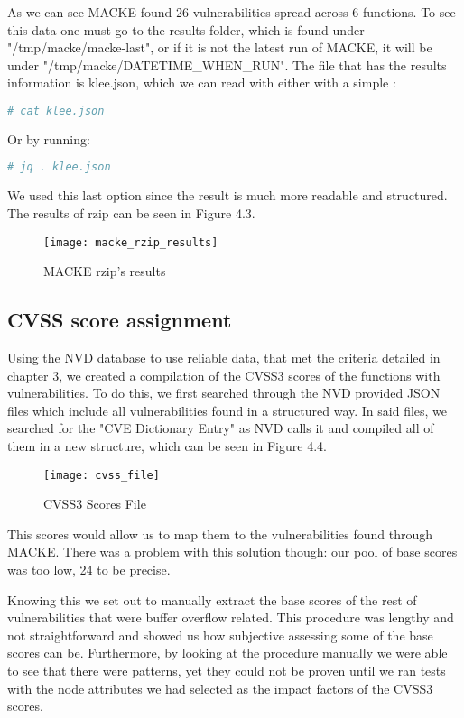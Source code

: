As we can see MACKE found 26 vulnerabilities spread across 6 functions. To see this data one must go to the results folder, which is found under "/tmp/macke/macke-last", or if it is not the latest run of MACKE, it will be under "/tmp/macke/DATETIME\_WHEN\_RUN". The file that has the results information is klee.json, which we can read with either with a simple :

\begin{lstlisting}[language=bash]
# cat klee.json
\end{lstlisting}

Or by running:

\begin{lstlisting}[language=bash]
# jq . klee.json
\end{lstlisting}

We used this last option since the result is much more readable and structured. The results of rzip can be seen in Figure 4.3.

\begin{figure}[H]
	\caption{MACKE rzip's results}
	\centering
	\texttt{[image: macke\_rzip\_results]}
\end{figure}

\subsection{CVSS score assignment}

Using the NVD database to use reliable data, that met the criteria detailed in chapter 3, we created a compilation of the CVSS3 scores of the functions with vulnerabilities. To do this, we first searched through the NVD provided JSON files which include all vulnerabilities found in a structured way. In said files, we searched for the "CVE Dictionary Entry" as NVD calls it \parencite{nvd} and compiled all of them in a new structure, which can be seen in Figure 4.4.

\begin{figure}[H]
	\caption{CVSS3 Scores File}
	\centering
	\texttt{[image: cvss\_file]}
\end{figure}

This scores would allow us to map them to the vulnerabilities found through MACKE. There was a problem with this solution though: our pool of base scores was too low, 24 to be precise.

Knowing this we set out to manually extract the base scores of the rest of vulnerabilities that were buffer overflow related. This procedure was lengthy and not straightforward and showed us how subjective assessing some of the base scores can be. Furthermore, by looking at the procedure manually we were able to see that there were patterns, yet they could not be proven until we ran tests with the node attributes we had selected as the impact factors of the CVSS3 scores.

